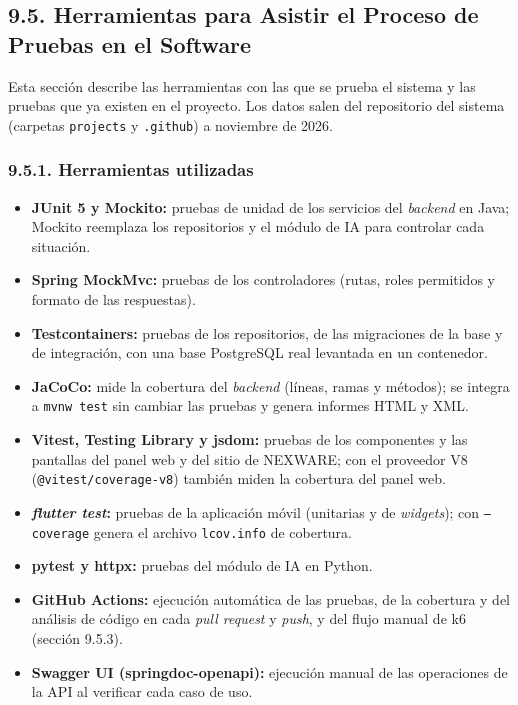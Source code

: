 \subsection{9.5. Herramientas para Asistir el Proceso de Pruebas en el Software}

Esta sección describe las herramientas con las que se prueba el sistema y las pruebas que ya existen en el proyecto. Los datos salen del repositorio del sistema (carpetas \texttt{projects} y \texttt{.github}) a noviembre de 2026.

\subsubsection{9.5.1. Herramientas utilizadas}

\begin{itemize}
    \item \textbf{JUnit 5 y Mockito:} pruebas de unidad de los servicios del \textit{backend} en Java; Mockito reemplaza los repositorios y el módulo de IA para controlar cada situación.
    \item \textbf{Spring MockMvc:} pruebas de los controladores (rutas, roles permitidos y formato de las respuestas).
    \item \textbf{Testcontainers:} pruebas de los repositorios, de las migraciones de la base y de integración, con una base PostgreSQL real levantada en un contenedor.
    \item \textbf{JaCoCo:} mide la cobertura del \textit{backend} (líneas, ramas y métodos); se integra a \texttt{mvnw test} sin cambiar las pruebas y genera informes HTML y XML.
    \item \textbf{Vitest, Testing Library y jsdom:} pruebas de los componentes y las pantallas del panel web y del sitio de NEXWARE; con el proveedor V8 (\texttt{@vitest/coverage-v8}) también miden la cobertura del panel web.
    \item \textbf{\textit{flutter test}:} pruebas de la aplicación móvil (unitarias y de \textit{widgets}); con \texttt{--coverage} genera el archivo \texttt{lcov.info} de cobertura.
    \item \textbf{pytest y httpx:} pruebas del módulo de IA en Python.
    \item \textbf{GitHub Actions:} ejecución automática de las pruebas, de la cobertura y del análisis de código en cada \textit{pull request} y \textit{push}, y del flujo manual de k6 (sección 9.5.3).
    \item \textbf{Swagger UI (springdoc-openapi):} ejecución manual de las operaciones de la API al verificar cada caso de uso.

\end{itemize}
